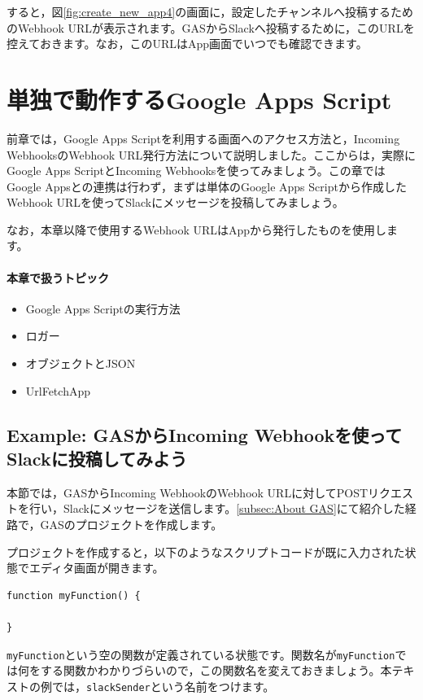 \documentclass[uplatex,a4j]{jsarticle}
\begin{document}
すると，図\ref{fig:create_new_app4}の画面に，設定したチャンネルへ投稿するためのWebhook URLが表示されます。GASからSlackへ投稿するために，このURLを控えておきます。なお，このURLはApp画面でいつでも確認できます。

\clearpage
\section{単独で動作するGoogle Apps Script}

前章では，Google Apps Scriptを利用する画面へのアクセス方法と，Incoming WebhooksのWebhook URL発行方法について説明しました。ここからは，実際にGoogle Apps ScriptとIncoming Webhooksを使ってみましょう。この章ではGoogle Appsとの連携は行わず，まずは単体のGoogle Apps Scriptから作成したWebhook URLを使ってSlackにメッセージを投稿してみましょう。

なお，本章以降で使用するWebhook URLはAppから発行したものを使用します。

\paragraph{本章で扱うトピック}
\begin{itemize}
\item Google Apps Scriptの実行方法
\item ロガー
\item オブジェクトとJSON
\item UrlFetchApp
\end{itemize}

\subsection{Example: GASからIncoming Webhookを使ってSlackに投稿してみよう}

本節では，GASからIncoming WebhookのWebhook URLに対してPOSTリクエストを行い，Slackにメッセージを送信します。\ref{subsec:About GAS}にて紹介した経路で，GASのプロジェクトを作成します。

プロジェクトを作成すると，以下のようなスクリプトコードが既に入力された状態でエディタ画面が開きます。

\begin{lstlisting}[basicstyle=\ttfamily\footnotesize,frame=single,caption=Default Script]
function myFunction() {

}
\end{lstlisting}

\verb|myFunction|という空の関数が定義されている状態です。関数名が\verb|myFunction|では何をする関数かわかりづらいので，この関数名を変えておきましょう。本テキストの例では，\verb|slackSender|という名前をつけます。
\end{document}
